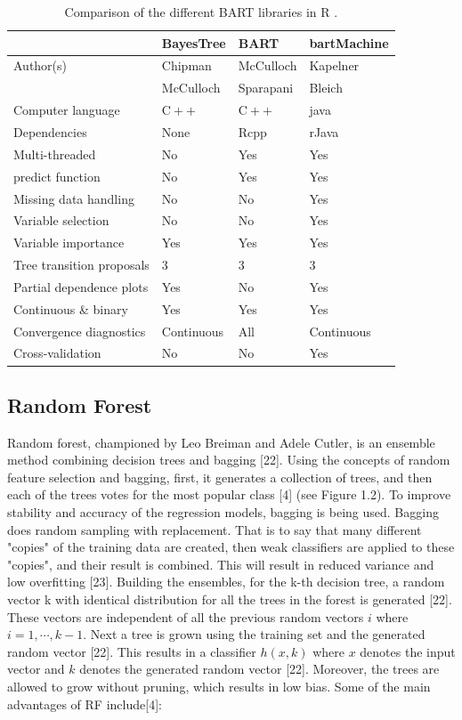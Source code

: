 \documentclass{usiinftr}
\begin{document}
\begin{table}[h!]
\centering
\caption{Comparison of the different BART libraries in R \cite{}.}
\begin{tabular}{l|lll} 
& BayesTree & BART & bartMachine \\
\hline Author(s) & Chipman & McCulloch & Kapelner \\
& McCulloch & Sparapani & Bleich \\
Computer language & $\mathrm{C}++$ & $\mathrm{C}++$ & java \\
Dependencies & None & Rcpp & rJava \\
Multi-threaded & No & Yes & Yes \\
predict function & No & Yes & Yes \\
Missing data handling & No & No & Yes \\
Variable selection & No & No & Yes \\
Variable importance & Yes & Yes & Yes \\
Tree transition proposals & 3 & 3 & 3 \\
Partial dependence plots & Yes & No & Yes \\
Continuous \& binary & Yes & Yes & Yes \\
Convergence diagnostics & Continuous & All & Continuous \\
Cross-validation & No & No & Yes \\
\hline
\end{tabular}
\end{table}

\subsection{Random Forest}
Random forest, championed by Leo Breiman and Adele Cutler, is an ensemble method combining decision trees and bagging [22]. Using the concepts of random feature selection and bagging, first, it generates a collection of trees, and then each of the trees votes for the most popular class [4] (see Figure 1.2). To improve stability and accuracy of the regression models, bagging is being used. Bagging does random sampling with replacement. That is to say that  many different "copies" of the training data are created, then weak classifiers are applied to these "copies", and their result is combined. This will result in reduced variance and low overfitting [23]. 
	Building the ensembles, for the k-th decision tree, a random vector k with identical distribution for all the trees in the forest is generated [22]. These vectors are independent of all the previous random vectors $i$ where $i = 1,\cdots,k-1$. Next a tree is grown using the training set and the generated random vector [22]. This results in a classifier $h(x,k)$ where $x$ denotes the input vector and $k$ denotes the generated random vector [22]. Moreover, the trees are allowed to grow without pruning, which results in low bias.  Some of the main advantages of RF include[4]:
\end{document}
